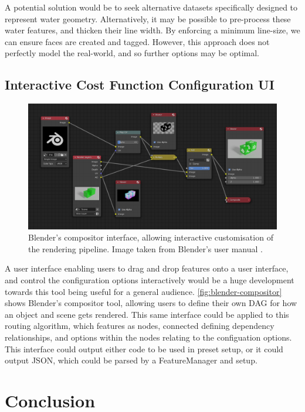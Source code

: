 \documentclass[12pt]{article}
\begin{document}
A potential solution would be to seek alternative datasets specifically designed to represent water geometry. Alternatively, it may be possible to pre-process these water features, and thicken their line width. By enforcing a minimum line-size, we can ensure faces are created and tagged. However, this approach does not perfectly model the real-world, and so further options may be optimal.

\subsection{Interactive Cost Function Configuration UI}

\begin{figure}[!htbp]
  \centering
  \includegraphics[width=\textwidth]{assets/blender-compositor.png}
  \caption{Blender's compositor interface, allowing interactive customisation of the rendering pipeline. Image taken from Blender's user manual \autocite{blenderCompositor}.}
  \label{fig:blender-compositor}
\end{figure}

A user interface enabling users to drag and drop features onto a user interface, and control the configuration options interactively would be a huge development towards this tool being useful for a general audience. \autoref{fig:blender-compositor} shows Blender's compositor tool, allowing users to define their own DAG for how an object and scene gets rendered. This same interface could be applied to this routing algorithm, which features as nodes, connected defining dependency relationships, and options within the nodes relating to the configuation options. This interface could output either code to be used in preset setup, or it could output JSON, which could be parsed by a FeatureManager and setup.

\section{Conclusion}
\end{document}
